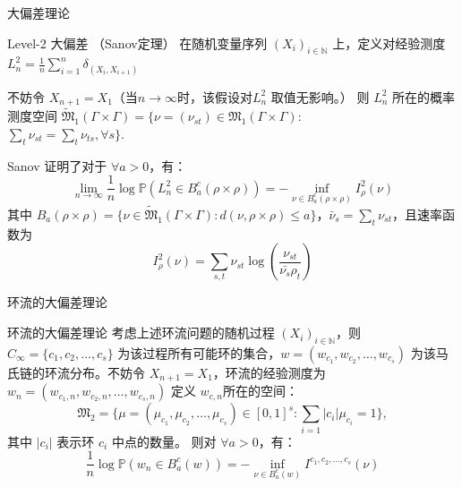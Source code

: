 \documentclass{beamer}
\begin{document}
\begin{frame}{大偏差理论}
	\begin{block}{Level-2 大偏差 （Sanov定理）}
		在随机变量序列 $(\mathit{X}_i)_{i\in \mathbb{N}}$ 上，定义对经验测度
		$\mathit{L}_n^2 = \frac{1}{n} \sum_{i=1}^n \delta_{(\mathit{X}_i, \mathit{X}_{i+1})}$

		不妨令 $\mathit{X}_{n+1} = \mathit{X}_1$（当$n\rightarrow \infty$时，该假设对$\mathit{L}_n^2$ 取值无影响。）
		则 $\mathit{L}_n^2$ 所在的概率测度空间
		$\widetilde{\mathfrak{M}}_1(\Gamma \times \Gamma) = \{\nu=(\nu_{st}) \in \mathfrak{M}_1(\Gamma \times \Gamma):$ \\$ \sum_{t} \nu_{st} = \sum_{t} \nu_{ts}, \forall s\}.$

			Sanov 证明了对于 $\forall a > 0$，有：
			$$
				\lim_{n \rightarrow \infty} \frac{1}{n} \log \mathbb{P}(\mathit{L}_n^2 \in B_a^c(\rho \times \rho))
				= - \inf_{\nu \in B_a^c(\rho \times \rho)} \mathit{I}_{\rho}^2(\nu)
			$$
			其中 $B_a(\rho \times \rho) = \{\nu \in \widetilde{\mathfrak{M}}_1(\Gamma \times \Gamma): d(\nu, \rho \times \rho) \le a\}$，$\bar{\nu}_s = \sum_t \nu_{st}$，且速率函数为
		$$
			\mathit{I}_{\rho}^2(\nu) = \sum_{s,t} \nu_{st} \log\left(\frac{\nu_{st}}{\bar{\nu_s}\rho_t}\right)
		$$
	\end{block}
\end{frame}

\begin{frame}{环流的大偏差理论}
	\begin{block}{环流的大偏差理论}
		考虑上述环流问题的随机过程 $(\mathit{X}_i)_{i\in \mathbb{N}}$，则 $C_{\infty}=\{c_1, c_2, \dots, c_s\}$ 为该过程所有可能环的集合，$\mathit{w} = \left(\mathit{w}_{c_1}, \mathit{w}_{c_2}, \dots, \mathit{w}_{c_s}\right)$ 为该马氏链的环流分布。不妨令 $\mathit{X}_{n+1} = \mathit{X}_1$，环流的经验测度为 $\mathit{w}_n = \left(\mathit{w}_{c_1, n}, \mathit{w}_{c_2, n}, \dots, \mathit{w}_{c_s, n}\right)$
		定义 $\mathit{w}_{c, n}$所在的空间：
		$$
			\mathfrak{M}_2 = \{\mu=\left(\mu_{c_1}, \mu_{c_2}, \dots, \mu_{c_s}\right)\in \left[0, 1\right]^s: \sum_{i=1} |c_i| \mu_{c_i}=1\},
		$$
		其中 $|c_i|$ 表示环 $c_i$ 中点的数量。
		则对 $\forall a >0$，有：
		$$
			\frac{1}{n} \log \mathbb{P} \left(\mathit{w}_n \in B_a^c(\mathit{w})\right) = - \inf_{\nu \in B_a^c(\mathit{w})} \mathit{I}^{c_1, c_2, \dots, c_s}(\nu)
		$$
	\end{block}
\end{frame}
\end{document}
